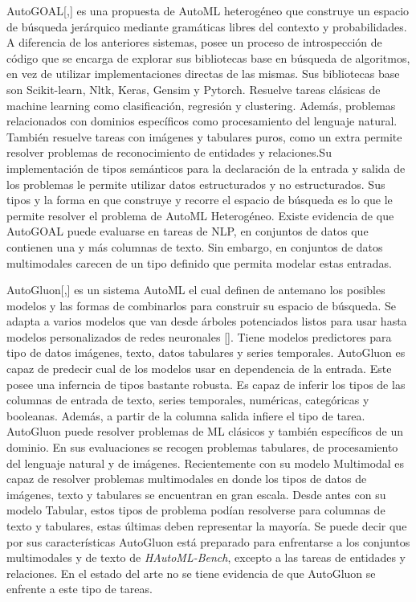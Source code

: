AutoGOAL[\cite{40},\cite{41}] es una propuesta de AutoML heterogéneo que construye un espacio de búsqueda jerárquico mediante gramáticas libres del contexto y 
probabilidades. A diferencia de los anteriores sistemas, posee un proceso de introspección de código que se encarga de explorar sus bibliotecas base en búsqueda de 
algoritmos, en vez de utilizar implementaciones directas de las mismas. Sus bibliotecas base son Scikit-learn, Nltk, Keras, Gensim y Pytorch. Resuelve tareas clásicas 
de machine learning como clasificación, regresión y clustering. Además, problemas relacionados con dominios específicos como procesamiento del lenguaje natural. También 
resuelve tareas con imágenes y tabulares puros, como un extra permite resolver problemas de reconocimiento de entidades y relaciones.Su implementación de tipos 
semánticos para la declaración de la entrada y salida de los problemas le permite utilizar datos estructurados y no estructurados. Sus tipos y la forma en que construye 
y recorre el espacio de búsqueda es lo que le permite resolver el problema de AutoML Heterogéneo. Existe evidencia de que AutoGOAL puede evaluarse en tareas de  NLP, 
en conjuntos de datos que contienen una y más columnas de texto. Sin embargo, en conjuntos de datos multimodales carecen de un tipo definido que permita modelar estas 
entradas.   

AutoGluon[\cite{17},\cite{42}] es un sistema AutoML el cual definen de antemano los posibles modelos y las formas de combinarlos para construir su espacio de búsqueda.
Se adapta a varios modelos que van desde árboles potenciados listos para usar hasta modelos personalizados de redes neuronales [\cite{37}]. Tiene modelos predictores 
para tipo de datos imágenes, texto, datos tabulares y series temporales. AutoGluon es capaz de predecir cual de los modelos usar en dependencia de la entrada.
Este posee una inferncia de tipos bastante robusta. Es capaz de inferir los tipos de las columnas de entrada de texto, series temporales, numéricas, categóricas y 
booleanas. Además, a partir de la columna salida infiere el tipo de tarea. AutoGluon puede resolver problemas de ML clásicos y también específicos de un dominio. En 
sus evaluaciones se recogen problemas tabulares, de procesamiento del lenguaje natural y de imágenes. Recientemente con su modelo Multimodal es capaz de resolver 
problemas multimodales en donde los tipos de datos de imágenes, texto y tabulares se encuentran en gran escala. Desde antes con su modelo Tabular, estos tipos de 
problema podían resolverse para columnas de texto y tabulares, estas últimas deben representar la mayoría. 
Se puede decir que por sus características AutoGluon está preparado para enfrentarse a los conjuntos multimodales y de texto de \textit{HAutoML-Bench}, excepto a 
las tareas de entidades y relaciones. En el estado del arte no se tiene evidencia de que AutoGluon se enfrente a este tipo de tareas.  

